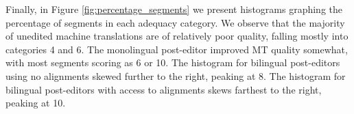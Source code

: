 Finally, in Figure \ref{fig:percentage_segments} we present histograms graphing the percentage of segments in each adequacy category.
%
We observe that the majority of unedited machine translations are of relatively poor quality, falling mostly into categories 4 and 6. %
%
The monolingual post-editor improved MT quality somewhat, with most segments scoring as 6 or 10.
%
The histogram for bilingual post-editors using no alignments skewed further to the right, peaking at 8.
%
The histogram for bilingual post-editors with access to alignments skews farthest to the right, peaking at 10.



